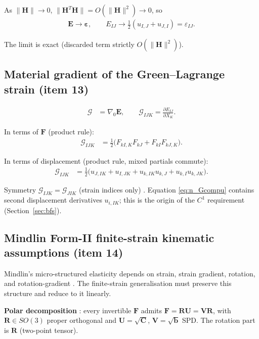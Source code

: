 \documentclass[11pt]{article}
\newcommand{\gradz}{\nabla_{0}}
\newcommand{\bF}{\mathbf{F}}
\newcommand{\bC}{\mathbf{C}}
\newcommand{\bb}{\mathbf{b}}
\newcommand{\bE}{\mathbf{E}}
\newcommand{\bep}{\boldsymbol{\varepsilon}}
\newcommand{\bH}{\mathbf{H}}
\newcommand{\bR}{\mathbf{R}}
\newcommand{\gradz}{\nabla_{0}}
\newcommand{\bF}{\mathbf{F}}
\newcommand{\bC}{\mathbf{C}}
\newcommand{\bb}{\mathbf{b}}
\newcommand{\bE}{\mathbf{E}}
\newcommand{\bep}{\boldsymbol{\varepsilon}}
\newcommand{\bH}{\mathbf{H}}
\newcommand{\bR}{\mathbf{R}}
\newcommand{\bU}{\mathbf{U}}
\newcommand{\bV}{\mathbf{V}}
\begin{document}
As $\|\bH\|\to0$, $\|\bH^{T}\bH\|=O(\|\bH\|^{2})\to0$, so
\begin{align}
\bE \to \bep,\qquad
E_{IJ}\to\tfrac12(u_{I,J}+u_{J,I})=\varepsilon_{IJ}.
\label{eq:n_limit2}
\end{align}

The limit is exact (discarded term strictly $O(\|\bH\|^{2})$).

\subsection{Material gradient of the Green--Lagrange strain (item 13)}
\label{sec:Gdef}

\begin{align}
\bm{\mathcal{G}} &= \gradz\bE,\qquad \mathcal{G}_{IJK}=\frac{\partial E_{IJ}}{\partial X_{K}}.
\label{eq:n_Gdef}
\end{align}

In terms of $\bF$ (product rule):
\begin{align}
\mathcal{G}_{IJK} &= \tfrac12\bigl(F_{kI,K}F_{kJ}+F_{kI}F_{kJ,K}\bigr).
\label{eq:n_GcompF}
\end{align}

In terms of displacement (product rule, mixed partials commute):
\begin{align}
\mathcal{G}_{IJK} &= \tfrac12\bigl(
      u_{J,IK}+u_{I,JK}+u_{k,IK}u_{k,J}+u_{k,I}u_{k,JK}
   \bigr).
\label{eq:n_Gcompu}
\end{align}

Symmetry $\mathcal{G}_{IJK}=\mathcal{G}_{JIK}$ (strain indices only) \checkmark. Equation
\eqref{eq:n_Gcompu} contains second displacement derivatives
$u_{i,IK}$; this is the origin of the $C^{1}$ requirement (Section~\ref{sec:bfs}).

\subsection{Mindlin Form-II finite-strain kinematic assumptions (item 14)}
\label{sec:form2}

Mindlin's micro-structured elasticity depends on strain, strain
gradient, rotation, and rotation-gradient \cite{Mindlin1964,
Mindlin1965,MindlinEshel1968}. The finite-strain generalisation must
preserve this structure and reduce to it linearly.

\textbf{Polar decomposition} \cite{Holzapfel2000}: every invertible
$\bF$ admits $\bF=\bR\bU=\bV\bR$, with
$\bR\in SO(3)$ proper orthogonal and $\bU=\sqrt{\bC}$,
$\bV=\sqrt{\bb}$ SPD. The rotation part is $\bR$ (two-point tensor).
\end{document}
